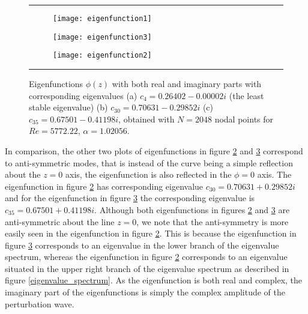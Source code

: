 \documentclass[a4paper, 12pt, twoside, openright]{article}
\numberwithin{equation}{section}
\begin{document}
\begin{figure}[H]
\begin{center}
\rule{\linewidth}{1.5pt}
\end{center}
\begin{subfigure}[b]{0.5\textwidth}
\texttt{[image: eigenfunction1]}\hfill
\caption{}
\label{eigenfunction1}%
\end{subfigure}
\begin{subfigure}[b]{0.5\textwidth}
\texttt{[image: eigenfunction3]}\hfill
\caption{}
\label{fig;eigenfunction3}%
\end{subfigure}
\begin{center}
\begin{subfigure}{0.5\textwidth}
\centering
\texttt{[image: eigenfunction2]}\hfill
\caption{}
\label{fig;eigenfunction2}%
\end{subfigure}
\end{center}
\caption{Eigenfunctions $\phi\left(z\right)$ with both real and imaginary parts with corresponding eigenvalues (a) $c_4=0.26402-0.00002i$ (the least stable eigenvalue) (b) $c_{30}=0.70631-0.29852i$ (c) $c_{35}=0.67501-0.41198i$, obtained with $N=2048$ nodal points for $Re=5772.22$, $\alpha=1.02056$.\label{fig;eigfns_Orr_Sommerfeld}}
\rule{\linewidth}{1.5pt}
\end{figure}
In comparison, the other two plots of eigenfunctions in figure \ref{fig;eigenfunction3} and \ref{fig;eigenfunction2} correspond to anti-symmetric modes, that is instead of the curve being a simple reflection about the $z = 0$ axis, the eigenfunction is also reflected in the $\phi = 0$ axis. The eigenfunction in figure \ref{fig;eigenfunction3} has corresponding eigenvalue $c_{30} = 0.70631 + 0.29852i$ and for the eigenfunction in figure \ref{fig;eigenfunction2} the corresponding eigenvalue is $c_{35} = 0.67501+0.41198i$. Although both eigenfunctions in figures \ref{fig;eigenfunction3} and \ref{fig;eigenfunction2} are anti-symmetric about the line $z=0$, we note that the anti-symmetry is more easily seen in the eigenfunction in figure \ref{fig;eigenfunction3}. This is because the eigenfunction in figure \ref{fig;eigenfunction2} corresponds to an eigenvalue in the lower branch of the eigenvalue spectrum, whereas the eigenfunction in figure \ref{fig;eigenfunction3} corresponds to an eigenvalue situated in the upper right branch of the eigenvalue spectrum as described in figure \ref{eigenvalue_spectrum}. As the eigenfunction is both real and complex, the imaginary part of the eigenfunctions is simply the complex amplitude of the perturbation wave.%
\end{document}
